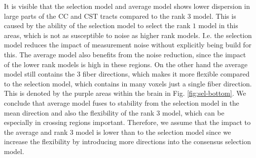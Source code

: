 It is visible that the
selection model and average model shows lower dispersion in large parts of the CC and CST tracts
compared to the rank $3$ model. This is caused by the
ability of the selection model to select the rank $1$ model in this areas, which
is not as susceptible to noise as higher rank models. I.e. the selection model
reduces the impact of measurement noise without explicitly being build for
this. The average model also benefits from the noise reduction, since the impact
of the lower rank models is high in these regions.
On the other hand the average model still contains the 3 fiber directions, which
makes it more flexible compared to the selection model, which contains in many
voxels just a single fiber direction. This is denoted by the purple areas within
the brain in Fig. \ref{fig:sel-bottom}.
We conclude that average model fuses to stability from the selection model in
the mean direction and also the flexibility of the rank $3$ model, which can be
especially in crossing regions important.
Therefore, we assume that the impact to the average and rank $3$ model is lower
than to the selection model since we increase the flexibility by introducing
more directions into the consensus selection model. 


